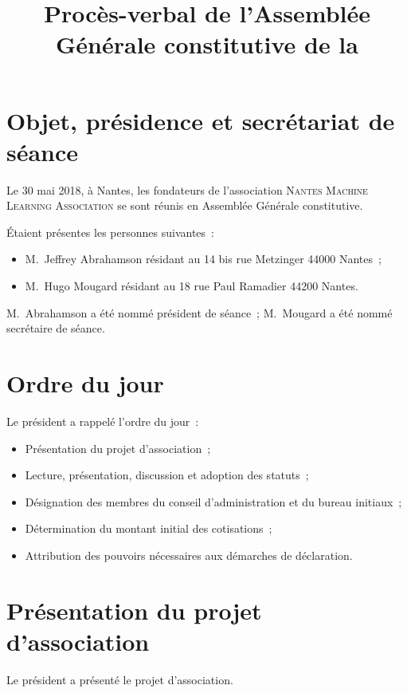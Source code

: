 \documentclass[12pt]{article}
\title{Procès-verbal de l'Assemblée Générale constitutive de la \Nom}
\date{}
\newcommand{\Nom}{\textsc{Nantes Machine Learning Association}}
\begin{document}
\maketitle

\section{Objet, présidence et secrétariat de séance}
\label{sec:objet}

Le 30 mai 2018, à Nantes, les fondateurs de l'association \Nom{} se
sont réunis en Assemblée Générale constitutive.

Étaient présentes les personnes suivantes :

\begin{itemize}
\item M.~Jeffrey Abrahamson résidant au 14 bis rue Metzinger 44000
  Nantes ;
\item M.~Hugo Mougard résidant au 18 rue Paul Ramadier 44200 Nantes.
\end{itemize}

M.~Abrahamson a été nommé président de séance ; M.~Mougard a été nommé
secrétaire de séance.

\section{Ordre du jour}
\label{sec:ordre-du-jour}

Le président a rappelé l'ordre du jour :

\begin{itemize}
\item Présentation du projet d'association ;
\item Lecture, présentation, discussion et adoption des statuts ;
\item Désignation des membres du conseil d'administration et du bureau
  initiaux ;
\item Détermination du montant initial des cotisations ;
\item Attribution des pouvoirs nécessaires aux démarches de déclaration.
\end{itemize}

\section{Présentation du projet d'association}
\label{sec:presentation-du-projet-d-association}

Le président a présenté le projet d'association.
\end{document}
